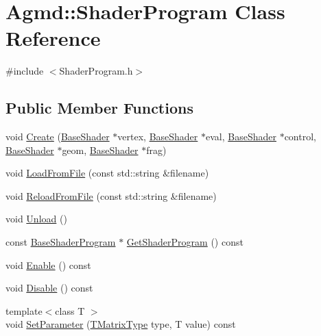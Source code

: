 \hypertarget{class_agmd_1_1_shader_program}{\section{Agmd\+:\+:Shader\+Program Class Reference}
\label{class_agmd_1_1_shader_program}
}


{\ttfamily \#include $<$Shader\+Program.\+h$>$}

\subsection*{Public Member Functions}
\begin{DoxyCompactItemize}
\item 
void \hyperlink{class_agmd_1_1_shader_program_afcc519105b0c24a1da657d9d2abc0ed5}{Create} (\hyperlink{class_agmd_1_1_base_shader}{Base\+Shader} $\ast$vertex, \hyperlink{class_agmd_1_1_base_shader}{Base\+Shader} $\ast$eval, \hyperlink{class_agmd_1_1_base_shader}{Base\+Shader} $\ast$control, \hyperlink{class_agmd_1_1_base_shader}{Base\+Shader} $\ast$geom, \hyperlink{class_agmd_1_1_base_shader}{Base\+Shader} $\ast$frag)
\item 
void \hyperlink{class_agmd_1_1_shader_program_ad3acc3c0bf03b73ee16393cdc52cffc9}{Load\+From\+File} (const std\+::string \&filename)
\item 
void \hyperlink{class_agmd_1_1_shader_program_af96c1ac7447140051a586e7d5884c01c}{Reload\+From\+File} (const std\+::string \&filename)
\item 
void \hyperlink{class_agmd_1_1_shader_program_ac58afd816450c490a1adcb69ac698971}{Unload} ()
\item 
const \hyperlink{class_agmd_1_1_base_shader_program}{Base\+Shader\+Program} $\ast$ \hyperlink{class_agmd_1_1_shader_program_ac91be6f67ed8fb319caf7d09acc9e606}{Get\+Shader\+Program} () const 
\item 
void \hyperlink{class_agmd_1_1_shader_program_a82a91655d5eb69a8ab4c41238bf6fa01}{Enable} () const 
\item 
void \hyperlink{class_agmd_1_1_shader_program_a32eabc1c6e85ad21629757e93cc63973}{Disable} () const 
\item 
{\footnotesize template$<$class T $>$ }\\void \hyperlink{class_agmd_1_1_shader_program_aacb8148fe622096be27a2dcdf01f2c29}{Set\+Parameter} (\hyperlink{namespace_agmd_aa7eba958a8a0e3ac4586f75298e122b1}{T\+Matrix\+Type} type, T value) const 
\item 

\end{DoxyCompactItemize}
